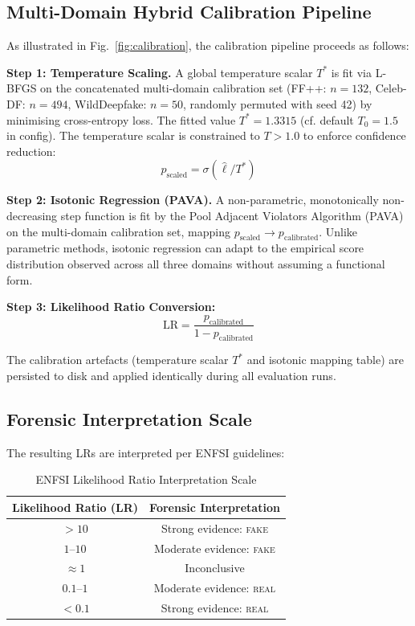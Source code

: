 \documentclass[journal]{IEEEtran}
\begin{document}
\subsection{Multi-Domain Hybrid Calibration Pipeline}
As illustrated in Fig.~\ref{fig:calibration}, the calibration pipeline proceeds as follows:

\textbf{Step 1: Temperature Scaling.} A global temperature scalar $T^*$ is fit via L-BFGS on the concatenated multi-domain calibration set (FF++: $n=132$, Celeb-DF: $n=494$, WildDeepfake: $n=50$, randomly permuted with seed 42) by minimising cross-entropy loss. The fitted value $T^* = 1.3315$ (cf. default $T_0 = 1.5$ in config). The temperature scalar is constrained to $T > 1.0$ to enforce confidence reduction:
\begin{equation}
p_\text{scaled} = \sigma\left(\hat{\ell} / T^*\right)
\end{equation}

\textbf{Step 2: Isotonic Regression (PAVA).} A non-parametric, monotonically non-decreasing step function is fit by the Pool Adjacent Violators Algorithm (PAVA) on the multi-domain calibration set, mapping $p_\text{scaled} \to p_\text{calibrated}$. Unlike parametric methods, isotonic regression can adapt to the empirical score distribution observed across all three domains without assuming a functional form.

\textbf{Step 3: Likelihood Ratio Conversion:}
\begin{equation}
\mathrm{LR} = \frac{p_\text{calibrated}}{1 - p_\text{calibrated}}
\end{equation}

The calibration artefacts (temperature scalar $T^*$ and isotonic mapping table) are persisted to disk and applied identically during all evaluation runs.

\subsection{Forensic Interpretation Scale}
The resulting LRs are interpreted per ENFSI guidelines:

\begin{table}[!t]
\renewcommand{\arraystretch}{1.3}
\caption{ENFSI Likelihood Ratio Interpretation Scale}
\label{tab:lr_scale}
\centering
\begin{tabular}{cc}
\toprule
\textbf{Likelihood Ratio (LR)} & \textbf{Forensic Interpretation} \\
\midrule
$> 10$       & Strong evidence: \textsc{fake} \\
$1$--$10$    & Moderate evidence: \textsc{fake} \\
$\approx 1$  & Inconclusive \\
$0.1$--$1$   & Moderate evidence: \textsc{real} \\
$< 0.1$      & Strong evidence: \textsc{real} \\
\bottomrule
\end{tabular}
\end{table}
\end{document}
